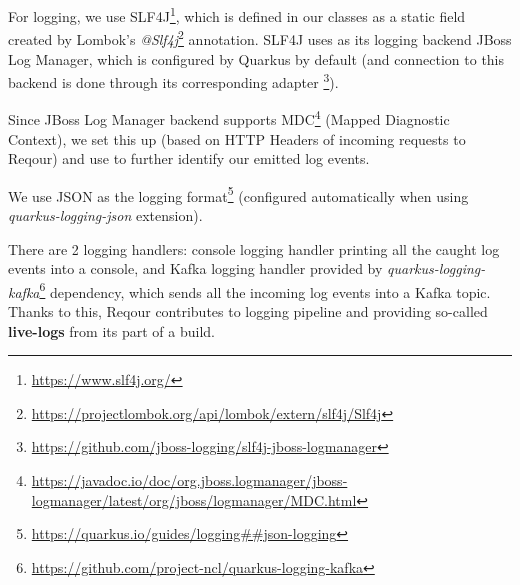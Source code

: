 \documentclass[../main.tex]{subfiles}
\begin{document}
For logging, we use SLF4J\footnote{\url{https://www.slf4j.org/}}, which is defined in our classes as a static field created by Lombok's \textit{@Slf4j}\footnote{\url{https://projectlombok.org/api/lombok/extern/slf4j/Slf4j}} annotation. SLF4J uses as its logging backend JBoss Log Manager, which is configured by Quarkus by default (and connection to this backend is done through its corresponding adapter \footnote{\url{https://github.com/jboss-logging/slf4j-jboss-logmanager}}).

Since JBoss Log Manager backend supports MDC\footnote{\url{https://javadoc.io/doc/org.jboss.logmanager/jboss-logmanager/latest/org/jboss/logmanager/MDC.html}} (Mapped Diagnostic Context), we set this up (based on HTTP Headers of incoming requests to Reqour) and use to further identify our emitted log events.

We use JSON as the logging format\footnote{\url{https://quarkus.io/guides/logging##json-logging}} (configured automatically when using \textit{quarkus-logging-json} extension).

There are 2 logging handlers: console logging handler printing all the caught log events into a console, and Kafka logging handler provided by \textit{quarkus-logging-kafka}\footnote{\url{https://github.com/project-ncl/quarkus-logging-kafka}} dependency, which sends all the incoming log events into a Kafka topic. Thanks to this, Reqour contributes to logging pipeline and providing so-called \textbf{live-logs} from its part of a build.
\end{document}
